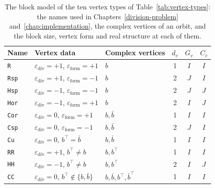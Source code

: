 \documentclass[12pt, a4paper]{report}
\theoremstyle{plain}
\theoremstyle{definition}
\theoremstyle{remark}
\theoremstyle{plain}
\newcommand{\epsilondiv}{\varepsilon_{\mathrm{div}}}
\newcommand{\epsilonform}{\varepsilon_{\mathrm{form}}}
\begin{document}
\begin{table}[htbp]
\centering
\caption{The block model of the ten vertex types of Table~\ref{tab:vertex-types}: the names used in Chapters~\ref{division-problem} and~\ref{chap:implementation}, the complex vertices of an orbit, and the block size, vertex form and real structure at each of them.}
\label{tab:vertex-blocks}
\small
\renewcommand{\arraystretch}{1.2}
\begin{tabular}{@{}lllccc@{}}
\toprule
\textbf{Name} & \textbf{Vertex data} & \textbf{Complex vertices} & $d_v$ & $G_v$ & $C_v$ \\
\midrule
\texttt{R}   & $\epsilondiv=+1$, $\epsilonform=+1$ & $b$ & 1 & $I$ & $I$ \\
\texttt{Rsp} & $\epsilondiv=+1$, $\epsilonform=-1$ & $b$ & 2 & $J$ & $I$ \\
\texttt{Hsp} & $\epsilondiv=-1$, $\epsilonform=-1$ & $b$ & 2 & $J$ & $J$ \\
\texttt{Hor} & $\epsilondiv=-1$, $\epsilonform=+1$ & $b$ & 2 & $I$ & $J$ \\
\texttt{Cor} & $\epsilondiv=0$, $\epsilonform=+1$ & $b,\bar b$ & 1 & $I$ & $I$ \\
\texttt{Csp} & $\epsilondiv=0$, $\epsilonform=-1$ & $b,\bar b$ & 2 & $J$ & $I$ \\
\texttt{Cu}  & $\epsilondiv=0$, $b^{\top}=\bar b$ & $b,\bar b$ & 1 & $I$ & $I$ \\
\texttt{RR}  & $\epsilondiv=+1$, $b^{\top}\neq b$ & $b,b^{\top}$ & 1 & $I$ & $I$ \\
\texttt{HH}  & $\epsilondiv=-1$, $b^{\top}\neq b$ & $b,b^{\top}$ & 2 & $I$ & $J$ \\
\texttt{CC}  & $\epsilondiv=0$, $b^{\top}\notin\{b,\bar b\}$ & $b,\bar b,b^{\top},\bar b^{\top}$ & 1 & $I$ & $I$ \\
\bottomrule
\end{tabular}
\end{table}
\end{document}

